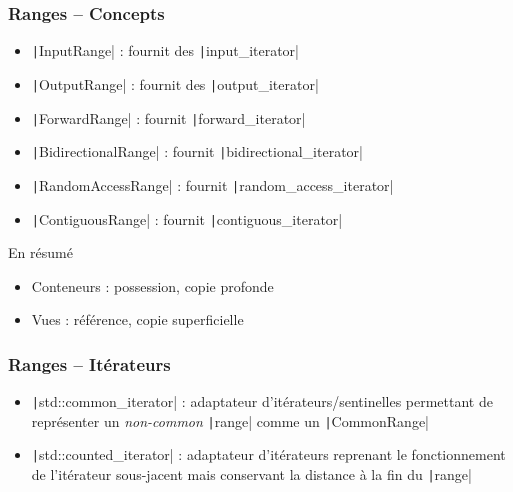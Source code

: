 \documentclass[C++.tex]{subfiles}
\begin{document}
\begin{frame}[fragile]
	\frametitle{Ranges -- Concepts}
	\begin{itemize}
		\item \texttt|InputRange| : fournit des \texttt|input_iterator|
		\item \texttt|OutputRange| : fournit des \texttt|output_iterator|
		\item \texttt|ForwardRange| : fournit \texttt|forward_iterator|
		\item \texttt|BidirectionalRange| : fournit \texttt|bidirectional_iterator|
		\item \texttt|RandomAccessRange| : fournit \texttt|random_access_iterator|
		\item \texttt|ContiguousRange| : fournit \texttt|contiguous_iterator|
	\end{itemize}

	\begin{block}{En résumé}
		\begin{itemize}
			\item Conteneurs : possession, copie profonde
			\item Vues : référence, copie superficielle
		\end{itemize}
	\end{block}
\end{frame}

\begin{frame}[fragile]
	\frametitle{Ranges -- Itérateurs}
	\begin{itemize}
		\item \texttt|std::common_iterator| : adaptateur d'itérateurs/sentinelles permettant de représenter un \textit{non-common} \texttt|range| comme un \texttt|CommonRange|


		\item \texttt|std::counted_iterator| : adaptateur d'itérateurs reprenant le fonctionnement de l'itérateur sous-jacent mais conservant la distance à la fin du \texttt|range|
	\end{itemize}
\end{frame}
\end{document}
